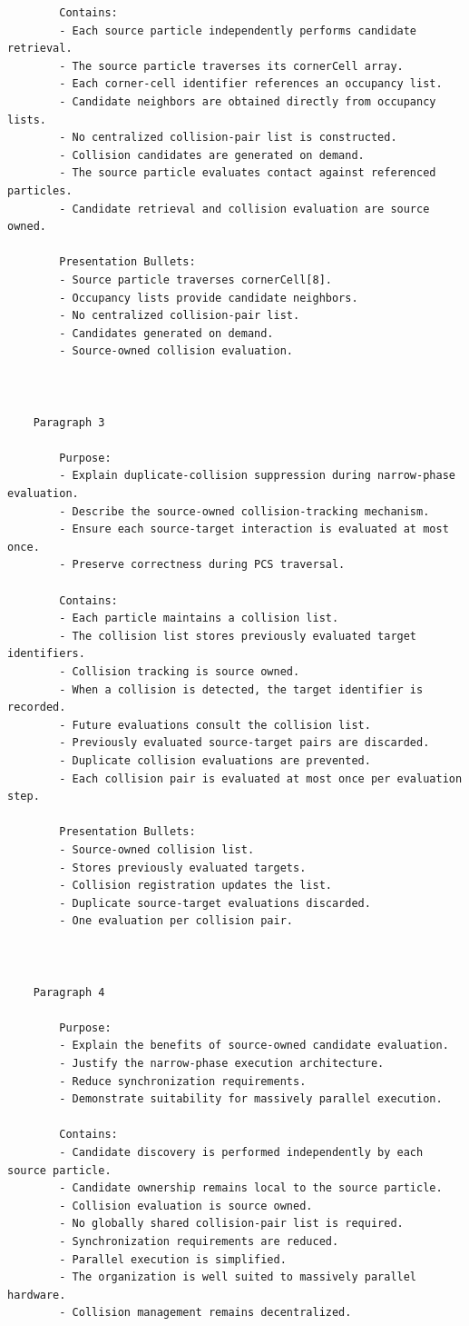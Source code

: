 \begin{verbatim}
		Contains:
		- Each source particle independently performs candidate retrieval.
		- The source particle traverses its cornerCell array.
		- Each corner-cell identifier references an occupancy list.
		- Candidate neighbors are obtained directly from occupancy lists.
		- No centralized collision-pair list is constructed.
		- Collision candidates are generated on demand.
		- The source particle evaluates contact against referenced particles.
		- Candidate retrieval and collision evaluation are source owned.

		Presentation Bullets:
		- Source particle traverses cornerCell[8].
		- Occupancy lists provide candidate neighbors.
		- No centralized collision-pair list.
		- Candidates generated on demand.
		- Source-owned collision evaluation.



	Paragraph 3

		Purpose:
		- Explain duplicate-collision suppression during narrow-phase evaluation.
		- Describe the source-owned collision-tracking mechanism.
		- Ensure each source-target interaction is evaluated at most once.
		- Preserve correctness during PCS traversal.

		Contains:
		- Each particle maintains a collision list.
		- The collision list stores previously evaluated target identifiers.
		- Collision tracking is source owned.
		- When a collision is detected, the target identifier is recorded.
		- Future evaluations consult the collision list.
		- Previously evaluated source-target pairs are discarded.
		- Duplicate collision evaluations are prevented.
		- Each collision pair is evaluated at most once per evaluation step.

		Presentation Bullets:
		- Source-owned collision list.
		- Stores previously evaluated targets.
		- Collision registration updates the list.
		- Duplicate source-target evaluations discarded.
		- One evaluation per collision pair.



	Paragraph 4

		Purpose:
		- Explain the benefits of source-owned candidate evaluation.
		- Justify the narrow-phase execution architecture.
		- Reduce synchronization requirements.
		- Demonstrate suitability for massively parallel execution.

		Contains:
		- Candidate discovery is performed independently by each source particle.
		- Candidate ownership remains local to the source particle.
		- Collision evaluation is source owned.
		- No globally shared collision-pair list is required.
		- Synchronization requirements are reduced.
		- Parallel execution is simplified.
		- The organization is well suited to massively parallel hardware.
		- Collision management remains decentralized.


\end{verbatim}
